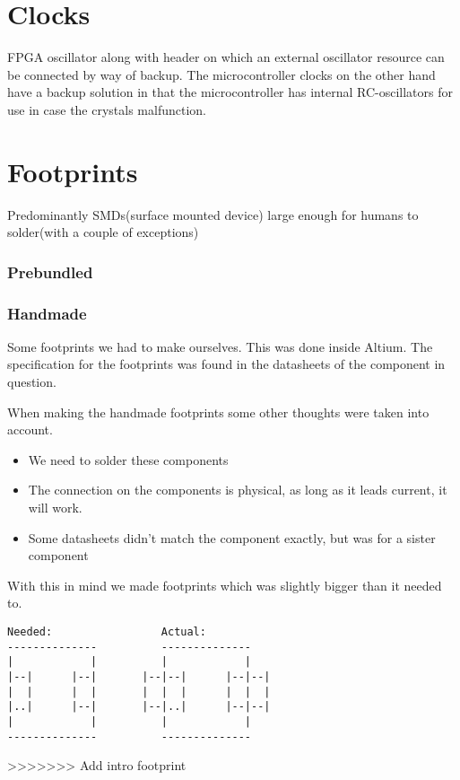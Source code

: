 \documentclass[../main/report.tex]{subfiles}
\begin{document}
\section{Clocks}
FPGA oscillator along with header on which an external oscillator resource can be connected by way of backup.
The microcontroller clocks on the other hand have a backup solution in that the microcontroller has internal RC-oscillators for use in case the crystals malfunction.


\section{Footprints}
Predominantly SMDs(surface mounted device) large enough for humans to solder(with a couple of exceptions)




\subsubsection{Prebundled}

\subsubsection{Handmade}
Some footprints we had to make ourselves.
This was done inside Altium.
The specification for the footprints was found in the datasheets of the component in question.

When making the handmade footprints some other thoughts were taken into account.

\begin{itemize}
    \item We need to solder these components
    \item The connection on the components is physical, as long as it leads current, it will work.
    \item Some datasheets didn't match the component exactly, but was for a sister component
\end{itemize}

With this in mind we made footprints which was slightly bigger than it needed to.

\begin{verbatim}
Needed:                 Actual:
--------------          --------------
|            |          |            |
|--|      |--|       |--|--|      |--|--|
|  |      |  |       |  |  |      |  |  |
|..|      |--|       |--|..|      |--|--|
|            |          |            |
--------------          --------------
\end{verbatim}
>>>>>>> Add intro footprint
\end{document}
